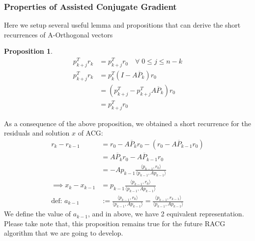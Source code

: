 \documentclass[]{article}
\theoremstyle{definition}
\newtheorem{prop}{Proposition}[section]  %
\begin{document}
        \subsubsection{Properties of Assisted Conjugate Gradient}
            Here we setup several useful lemma and propositions that can derive the short recurrences of A-Orthogonal vectors 
            \begin{prop}
                \begin{align}
                    p_{k + j}^Tr_k &= p_{k + j}^Tr_0 \quad \forall \; 0 \le j \le n - k
                    \\
                    p_{k + j}^Tr_k &= p_k^T(I - A\overline{P}_k)r_0
                    \\
                    &= (p^T_{k + j} - p^T_{k + j}A\overline{P}_k)r_0
                    \\
                    &= p_{k + j}^Tr_0    
                \end{align}
            \end{prop}
            As a consequence of the above proposition, we obtained a short recurrence for the residuals and solution $x$ of ACG: 
            \begin{align}
                    r_k - r_{k - 1} &= r_0 - A\overline{P}_kr_0 - (r_0 - A\overline{P}_{k - 1}r_0)
                    \\
                    &= A\overline{P}_kr_0 - A\overline{P}_{k - 1}r_0
                    \\
                    &= - Ap_{k - 1}\frac{\langle p_{k - 1}, r_0\rangle}{\langle p_{k - 1}, Ap_{k - 1}\rangle}
                    \\
                    \implies 
                    x_{k} - x_{k - 1} &= 
                    p_{k - 1}\frac{\langle p_{k - 1}, r_0\rangle}{\langle p_{k - 1}, Ap_{k - 1}\rangle}
                    \\
                    \text{def: } a_{k - 1} &:= \frac{\langle p_{k - 1}, r_0\rangle}{
                        \langle p_{k - 1}, Ap_{k - 1}\rangle
                    } = 
                    \frac{\langle p_{k - 1}, r_{k - 1}\rangle}{
                        \langle p_{k - 1}, Ap_{k - 1}\rangle
                    }
            \end{align}
            We define the value of $a_{k - 1}$, and in above, we have 2 equivalent representation. Please take note that, this proposition remains true for the future RACG algorithm that we are going to develop. 
\end{document}
